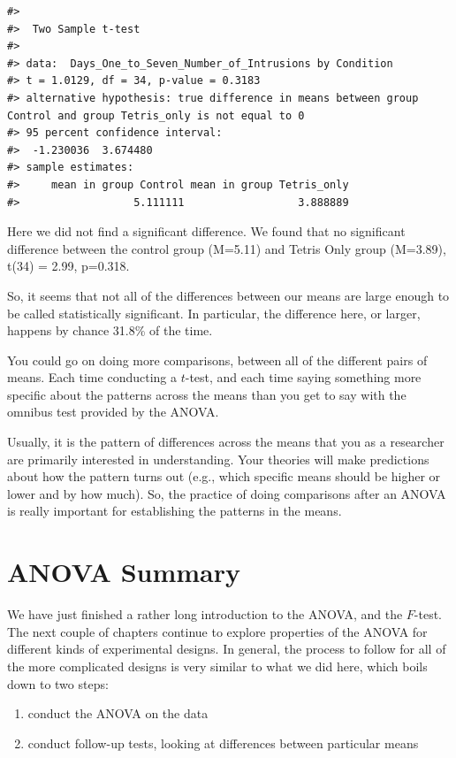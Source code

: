 \documentclass[
  letterpaper,
  DIV=11,
  numbers=noendperiod]{scrreprt}
\providecommand{\tightlist}{%
  \setlength{\itemsep}{0pt}\setlength{\parskip}{0pt}}\usepackage{longtable,booktabs,array}
\begin{document}
\begin{verbatim}
#> 
#>  Two Sample t-test
#> 
#> data:  Days_One_to_Seven_Number_of_Intrusions by Condition
#> t = 1.0129, df = 34, p-value = 0.3183
#> alternative hypothesis: true difference in means between group Control and group Tetris_only is not equal to 0
#> 95 percent confidence interval:
#>  -1.230036  3.674480
#> sample estimates:
#>     mean in group Control mean in group Tetris_only 
#>                  5.111111                  3.888889
\end{verbatim}

Here we did not find a significant difference. We found that no
significant difference between the control group (M=5.11) and Tetris
Only group (M=3.89), t(34) = 2.99, p=0.318.

So, it seems that not all of the differences between our means are large
enough to be called statistically significant. In particular, the
difference here, or larger, happens by chance 31.8\% of the time.

You could go on doing more comparisons, between all of the different
pairs of means. Each time conducting a \(t\)-test, and each time saying
something more specific about the patterns across the means than you get
to say with the omnibus test provided by the ANOVA.

Usually, it is the pattern of differences across the means that you as a
researcher are primarily interested in understanding. Your theories will
make predictions about how the pattern turns out (e.g., which specific
means should be higher or lower and by how much). So, the practice of
doing comparisons after an ANOVA is really important for establishing
the patterns in the means.

\section{ANOVA Summary}\label{anova-summary}

We have just finished a rather long introduction to the ANOVA, and the
\(F\)-test. The next couple of chapters continue to explore properties
of the ANOVA for different kinds of experimental designs. In general,
the process to follow for all of the more complicated designs is very
similar to what we did here, which boils down to two steps:

\begin{enumerate}
\def\labelenumi{\arabic{enumi})}
\tightlist
\item
  conduct the ANOVA on the data
\item
  conduct follow-up tests, looking at differences between particular
  means
\end{enumerate}
\end{document}
